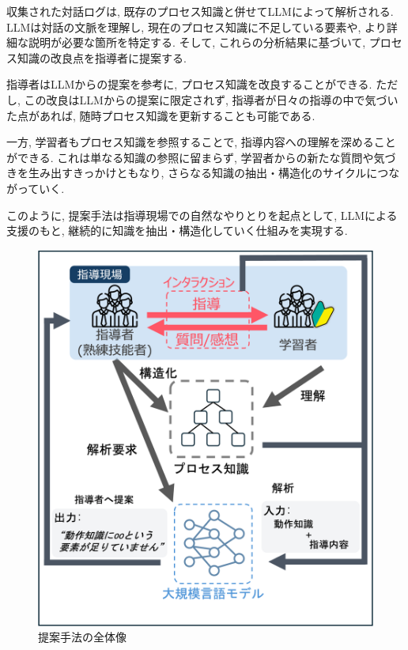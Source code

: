 収集された対話ログは, 既存のプロセス知識と併せてLLMによって解析される. LLMは対話の文脈を理解し, 現在のプロセス知識に不足している要素や, より詳細な説明が必要な箇所を特定する. そして, これらの分析結果に基づいて, プロセス知識の改良点を指導者に提案する. 

指導者はLLMからの提案を参考に, プロセス知識を改良することができる. ただし, この改良はLLMからの提案に限定されず, 指導者が日々の指導の中で気づいた点があれば, 随時プロセス知識を更新することも可能である. 

一方, 学習者もプロセス知識を参照することで, 指導内容への理解を深めることができる. これは単なる知識の参照に留まらず, 学習者からの新たな質問や気づきを生み出すきっかけともなり, さらなる知識の抽出・構造化のサイクルにつながっていく. 

このように, 提案手法は指導現場での自然なやりとりを起点として, LLMによる支援のもと, 継続的に知識を抽出・構造化していく仕組みを実現する. 

\begin{figure}[htbp]
    \centering
    \includegraphics[width=0.9\linewidth]{./image/overview_2.png}
    \caption{提案手法の全体像}
    \label{fig1}
\end{figure}
